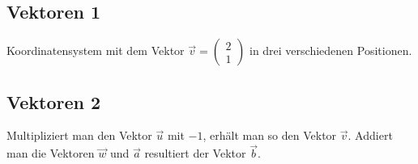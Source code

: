 \documentclass{article}
\newcommand{\m}[1]{\begin{pmatrix}#1\end{pmatrix}}
\begin{document}
    \subsection{Vektoren 1}
    \begin{figure}[h]
        \centering
    \end{figure}
    Koordinatensystem mit dem Vektor $\vec{v} = \m{2 \\ 1}$ in drei verschiedenen Positionen.

    \subsection{Vektoren 2}
    \begin{figure}[h]
        \centering
    \end{figure}
    Multipliziert man den Vektor $\vec{u}$ mit $-1$, erhält man so den Vektor $\vec{v}$.
    Addiert man die Vektoren $\vec{w}$ und $\vec{a}$ resultiert der Vektor $\vec{b}$.
\end{document}
